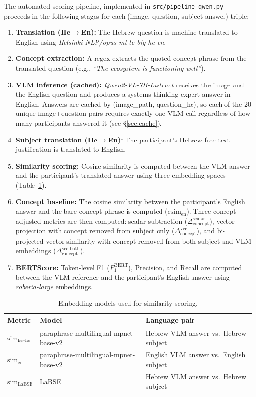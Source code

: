 \documentclass[12pt,a4paper]{article}
\newcommand{\vlm}{\textsc{VLM}}
\newcommand{\simEN}{\ensuremath{\mathrm{sim}_{\text{en}}}}
\newcommand{\simHH}{\ensuremath{\mathrm{sim}_{\text{he--he}}}}
\newcommand{\simLaBSE}{\ensuremath{\mathrm{sim}_{\text{LaBSE}}}}
\newcommand{\csim}{\ensuremath{\mathrm{csim}_{\text{en}}}}
\newcommand{\SACs}{\ensuremath{\Delta_{\text{concept}}^{\text{scalar}}}}
\newcommand{\SACv}{\ensuremath{\Delta_{\text{concept}}^{\text{vec}}}}
\newcommand{\SACvb}{\ensuremath{\Delta_{\text{concept}}^{\text{vec-both}}}}
\newcommand{\bsF}{\ensuremath{F_1^{\text{BERT}}}}
\newcommand{\Qwen}{\textit{Qwen2-VL-7B-Instruct}}
\begin{document}
The automated scoring pipeline, implemented in \texttt{src/pipeline\_qwen.py}, proceeds
in the following stages for each (image, question, subject-answer) triple:

\begin{enumerate}
  \item \textbf{Translation (He$\to$En):} The Hebrew question is machine-translated to
        English using \textit{Helsinki-NLP/opus-mt-tc-big-he-en}.
  \item \textbf{Concept extraction:} A regex extracts the quoted concept phrase from the
        translated question (e.g., \textit{``The ecosystem is functioning well''}).
  \item \textbf{VLM inference (cached):} \Qwen{} receives the image and the English
        question and produces a systems-thinking expert answer in English.  Answers are
        cached by (image\_path, question\_he), so each of the 20 unique image+question
        pairs requires exactly one VLM call regardless of how many participants answered
        it (see \S\ref{sec:cache}).
  \item \textbf{Subject translation (He$\to$En):} The participant's Hebrew free-text
        justification is translated to English.
  \item \textbf{Similarity scoring:} Cosine similarity is computed between the \vlm{}
        answer and the participant's translated answer using three embedding spaces
        (Table~\ref{tab:embeddings}).
  \item \textbf{Concept baseline:} The cosine similarity between the participant's
        English answer and the bare concept phrase is computed (\csim{}).  Three
        concept-adjusted metrics are then computed: scalar subtraction (\SACs{}),
        vector projection with concept removed from subject only (\SACv{}), and
        bi-projected vector similarity with concept removed from both subject and VLM
        embeddings (\SACvb{}).
  \item \textbf{BERTScore:} Token-level F1 (\bsF{}), Precision, and Recall
        are computed between the \vlm{} reference and the participant's English answer
        using \textit{roberta-large} embeddings.
\end{enumerate}

\begin{table}[H]
\centering
\caption{Embedding models used for similarity scoring.}
\label{tab:embeddings}
\small
\begin{tabular}{lll}
\toprule
\textbf{Metric} & \textbf{Model} & \textbf{Language pair} \\
\midrule
\simHH{}  & paraphrase-multilingual-mpnet-base-v2 & Hebrew VLM answer vs.\ Hebrew subject \\
\simEN{}  & paraphrase-multilingual-mpnet-base-v2 & English VLM answer vs.\ English subject \\
\simLaBSE{} & LaBSE & Hebrew VLM answer vs.\ Hebrew subject \\
\bottomrule
\end{tabular}
\end{table}
\end{document}
